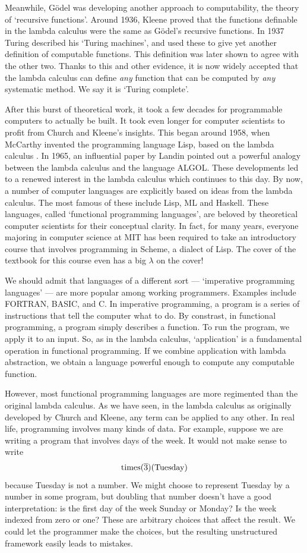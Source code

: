\documentclass[12pt,twoside,openright]{report}
\newcommand{\Times}{{\rm times}}
\newcommand{\Tuesday}{{\rm Tuesday}}
\begin{document}
Meanwhile, G\"odel was developing another approach to computability, the theory of `recursive functions'.  Around 1936, Kleene proved that the functions definable in the lambda calculus were the same as G\"odel's recursive functions.  In 1937 Turing described his `Turing machines', and used these to give yet another definition of computable functions.  This definition was later shown to agree with the other two.  Thanks to this and other evidence, it is now widely accepted that the lambda calculus can define {\it any} function that can be computed by {\it any} systematic method.  We say it is `Turing complete'.

After this burst of theoretical work, it took a few decades for programmable computers to actually be built.  It took even longer for computer scientists to profit from Church and Kleene's insights. This began around 1958, when McCarthy invented the programming language Lisp, based on the lambda calculus \cite{McCarthy}. In 1965, an influential paper by Landin \cite{Landin} pointed out a powerful analogy between the lambda calculus and the language ALGOL.    These developments led to a renewed interest in the lambda calculus which continues to this day.  By now, a number of computer languages are explicitly based on ideas from the lambda calculus.  The most famous of these include Lisp, ML and Haskell.  These languages, called `functional programming languages', are beloved by theoretical computer scientists for their conceptual clarity.  In fact, for many years, everyone majoring in computer science at MIT has been required to take an introductory course that involves programming in Scheme, a dialect of Lisp.  The cover of the textbook for this course \cite{Sussman} even has a big $\lambda$ on the cover!

We should admit that languages of a different sort --- `imperative programming languages' --- are more popular among working programmers. Examples include FORTRAN, BASIC, and C.  In imperative programming, a program is a series of instructions that tell the computer what to do. By constrast, in functional programming, a program simply describes a function.  To run the program, we apply it to an input.  So, as in the lambda calculus, `application' is a fundamental operation in functional programming.  If we combine application with lambda abstraction, we obtain a language powerful enough to compute any computable function.  

However, most functional programming languages are more regimented than the original lambda calculus.  As we have seen, in the lambda calculus as originally developed by Church and Kleene, any term can be applied to any other.  In real life, programming involves many kinds of data.  For example, suppose we are writing a program that involves days of the week.  It would not make sense to write 
\[       \Times(\overline{3})(\Tuesday)  \]
because Tuesday is not a number.  We might choose to represent Tuesday by a number in some program, but doubling that number doesn't have a good interpretation: is the first day of the week Sunday or Monday?
Is the week indexed from zero or one?  These are arbitrary choices that affect the result.  We could let the programmer make the choices, but the resulting unstructured framework easily leads to mistakes.  
\end{document}
